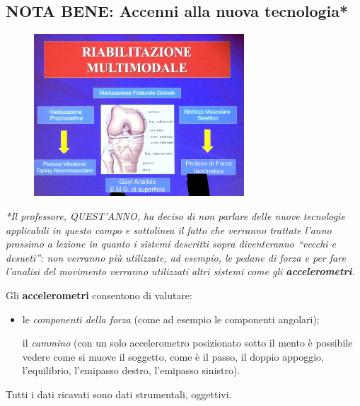 \subsection{NOTA BENE: Accenni alla nuova tecnologia*}

\begin{figure}[!ht]
\centering
	\includegraphics[width=0.7\textwidth]{030/image19.jpeg}
\end{figure}
\emph{*Il professore, QUEST'ANNO, ha deciso di non parlare delle nuove
tecnologie applicabili in questo campo e sottolinea il fatto che
verranno trattate l'anno prossimo a lezione in quanto i sistemi
descritti sopra diventeranno ``\emph{vecchi e desueti''}: non verranno
più utilizzate, ad esempio, le pedane di forza e per fare l'analisi del
movimento verranno utilizzati altri sistemi come gli
\textbf{accelerometri}.}

Gli \textbf{accelerometri} consentono di valutare:

\begin{itemize}
 
\item
  le \emph{componenti della forza} (come ad esempio le componenti
  angolari);

  il \emph{cammino} (con un solo accelerometro posizionato sotto il
  mento è possibile vedere come si muove il soggetto, come è il passo,
  il doppio appoggio, l'equilibrio, l'emipasso destro, l'emipasso
  sinistro).
\end{itemize}

Tutti i dati ricavati sono dati strumentali, oggettivi.

